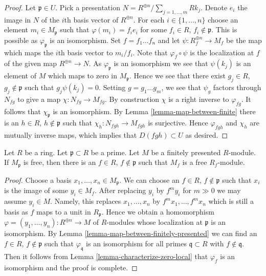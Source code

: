 \begin{proof}
Let $\mathfrak p \in U$. Pick a presentation
$N = R^{\oplus n}/\sum_{j = 1, \ldots, m} R k_j$.
Denote $e_i$ the image in $N$ of the $i$th basis vector of $R^{\oplus n}$.
For each $i \in \{1, \ldots, n\}$ choose an element
$m_i \in M_{\mathfrak p}$ such that $\varphi(m_i) = f_i e_i$
for some $f_i \in R$, $f_i \not \in \mathfrak p$. This is possible
as $\varphi_{\mathfrak p}$ is an isomorphism. Set $f = f_1 \ldots f_n$
and let $\psi : R_f^{\oplus n} \to M_f$ be the map which maps
the $i$th basis vector to $m_i/f_i$. Note that
$\varphi_f \circ \psi$ is the localization
at $f$ of the given map $R^{\oplus n} \to N$.
As $\varphi_{\mathfrak p}$ is an isomorphism we
see that $\psi(k_j)$ is an element of $M$ which maps to zero
in $M_{\mathfrak p}$. Hence we see that there exist
$g_j \in R$, $g_j \not \in \mathfrak p$ such that $g_j \psi(k_j) = 0$.
Setting $g = g_1 \ldots g_m$, we see that $\psi_g$ factors through
$N_{fg}$ to give a map $\chi : N_{fg} \to M_{fg}$. By construction
$\chi$ is a right inverse to $\varphi_{fg}$. It follows that
$\chi_\mathfrak p$ is an isomorphism. By Lemma \ref{lemma-map-between-finite}
there is an $h \in R$, $h \not \in \mathfrak p$ such that
$\chi_h : N_{fgh} \to M_{fgh}$ is surjective.
Hence $\varphi_{fgh}$ and $\chi_h$ are mutually inverse maps,
which implies that $D(fgh) \subset U$ as desired.
\end{proof}

\begin{lemma}
\label{lemma-finitely-presented-localization-free}
Let $R$ be a ring. Let $\mathfrak p \subset R$ be a prime.
Let $M$ be a finitely presented $R$-module. If $M_\mathfrak p$
is free, then there is an $f \in R$, $f \not \in \mathfrak p$
such that $M_f$ is a free $R_f$-module.
\end{lemma}

\begin{proof}
Choose a basis $x_1, \ldots, x_n \in M_\mathfrak p$. We can choose
an $f \in R$, $f \not \in \mathfrak p$ such that $x_i$ is the image
of some $y_i \in M_f$. After replacing $y_i$ by $f^m y_i$ for $m \gg 0$
we may assume $y_i \in M$. Namely, this replaces $x_1, \ldots, x_n$
by $f^mx_1, \ldots, f^mx_n$ which is still a basis as $f$ maps to
a unit in $R_\mathfrak p$. Hence
we obtain a homomorphism $\varphi = (y_1, \ldots, y_n) : R^{\oplus n} \to M$
of $R$-modules whose localization at $\mathfrak p$ is an isomorphism.
By Lemma \ref{lemma-map-between-finitely-presented}
we can find an $f \in R$, $f \not \in \mathfrak p$
such that $\varphi_\mathfrak q$ is an isomorphism for all primes
$\mathfrak q \subset R$ with $f \not \in \mathfrak q$.
Then it follows from Lemma \ref{lemma-characterize-zero-local}
that $\varphi_f$ is an isomorphism and the proof is complete.
\end{proof}

